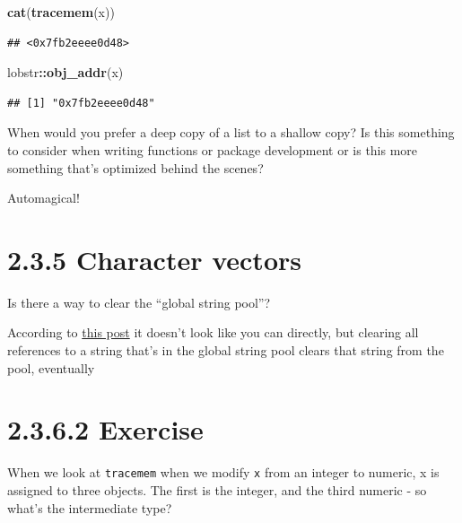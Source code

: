 \documentclass[]{book}
\newenvironment{Shaded}{\begin{snugshade}}{\end{snugshade}}
\newcommand{\KeywordTok}[1]{\textcolor[rgb]{0.13,0.29,0.53}{\textbf{#1}}}
\newcommand{\NormalTok}[1]{#1}
\newcommand{\OperatorTok}[1]{\textcolor[rgb]{0.81,0.36,0.00}{\textbf{#1}}}
\begin{document}
\begin{Shaded}
\begin{Highlighting}[]
\KeywordTok{cat}\NormalTok{(}\KeywordTok{tracemem}\NormalTok{(x))}
\end{Highlighting}
\end{Shaded}

\begin{verbatim}
## <0x7fb2eeee0d48>
\end{verbatim}

\begin{Shaded}
\begin{Highlighting}[]
\NormalTok{lobstr}\OperatorTok{::}\KeywordTok{obj_addr}\NormalTok{(x)}
\end{Highlighting}
\end{Shaded}

\begin{verbatim}
## [1] "0x7fb2eeee0d48"
\end{verbatim}

When would you prefer a deep copy of a list to a shallow copy? Is this something to consider when writing functions or package development or is this more something that's optimized behind the scenes?

Automagical!

\hypertarget{character-vectors}{%
\section*{2.3.5 Character vectors}\label{character-vectors}}

Is there a way to clear the ``global string pool''?

According to \href{https://community.rstudio.com/t/memory-usage-and-rs-global-string-pool/4762/3}{this post} it doesn't look like you can directly, but clearing all references to a string that's in the global string pool clears that string from the pool, eventually

\hypertarget{exercise}{%
\section*{2.3.6.2 Exercise}\label{exercise}}

When we look at \texttt{tracemem} when we modify \texttt{x} from an integer to numeric, x is assigned to three objects. The first is the integer, and the third numeric - so what's the intermediate type?
\end{document}
